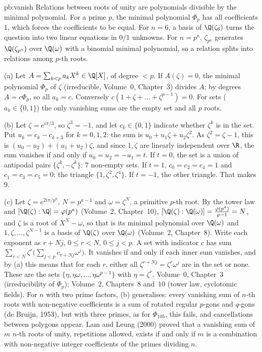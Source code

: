 \begin{solution}{pb:vanish}
\idea Relations between roots of unity are polynomials divisible by the minimal polynomial. For a prime $p$, the minimal
polynomial $\Phi_p$ has all coefficients $1$, which forces the coefficients to be equal. For $n=6$, a basis of
$\Q(\zeta_6)$ turns the question into two linear equations in $0$/$1$ unknowns. For $n=p^a$, $\zeta_{p^a}$ generates
$\Q(\zeta_{p^a})$ over $\Q(\omega)$ with a binomial minimal polynomial, so a relation splits into relations among $p$-th roots.

\writeup (a) Let $A=\sum_{k<p}a_kX^k\in\Q[X]$, of degree $<p$. If $A(\zeta)=0$, the minimal polynomial $\Phi_p$ of $\zeta$
(irreducible, Volume~0, Chapter~3) divides $A$; by degrees $A=c\Phi_p$, so all $a_k=c$. Conversely
$c(1+\zeta+\dots+\zeta^{p-1})=0$. For sets ($a_k\in\{0,1\}$) the only vanishing sums are the empty set and all $p$ roots.

(b) Let $\zeta=e^{i\pi/3}$, so $\zeta^3=-1$, and let $c_k\in\{0,1\}$ indicate whether $\zeta^k$ is in the set. Put
$u_k=c_k-c_{k+3}$ for $k=0,1,2$: the sum is $u_0+u_1\zeta+u_2\zeta^2$. As $\zeta^2=\zeta-1$, this is
$(u_0-u_2)+(u_1+u_2)\zeta$, and since $1,\zeta$ are linearly independent over $\R$, the sum vanishes if and only if
$u_0=u_2=-u_1=t$. If $t=0$, the set is a union of antipodal pairs $\{\zeta^k,-\zeta^k\}$: $7$ non-empty sets. If $t=1$,
$c_0=c_2=c_4=1$ and $c_1=c_3=c_5=0$: the triangle $\{1,\zeta^2,\zeta^4\}$. If $t=-1$, the other triangle. That makes $9$.

(c) Let $\zeta=e^{2i\pi/p^a}$, $N=p^{a-1}$ and $\omega=\zeta^N$, a primitive $p$-th root. By the tower law and
$[\Q(\zeta):\Q]=\varphi(p^a)$ (Volume~2, Chapter~10), $[\Q(\zeta):\Q(\omega)]=\frac{\varphi(p^a)}{p-1}=N$, and $\zeta$ is a root
of $X^N-\omega$, so that is its minimal polynomial over $\Q(\omega)$ and $1,\zeta,\dots,\zeta^{N-1}$ is a basis of $\Q(\zeta)$
over $\Q(\omega)$ (Volume~2, Chapter~8). Write each exponent as $r+Nj$, $0\le r<N$, $0\le j<p$. A set with indicator $c$ has
sum $\sum_{r<N}\zeta^r\bigl(\sum_{j<p}c_{r+Nj}\omega^j\bigr)$. It vanishes if and only if each inner sum vanishes, and by (a)
this means that for each $r$, either all $\zeta^{r+Nj}=\zeta^r\omega^j$ are in the set or none. These are the sets
$\{\eta,\eta\omega,\dots,\eta\omega^{p-1}\}$ with $\eta=\zeta^r$.
\tools Volume~0, Chapter~3 (irreducibility of $\Phi_p$); Volume~2, Chapters~8 and~10 (tower law, cyclotomic fields).
\leads For $n$ with two prime factors, (b) generalises: every vanishing sum of $n$-th roots with non-negative coefficients
is a sum of rotated regular $p$-gons and $q$-gons (de Bruijn, 1953), but with three primes, as for $\Phi_{105}$, this
fails, and cancellations between polygons appear. Lam and Leung (2000) proved that a vanishing sum of $m$ $n$-th roots of
unity, repetitions allowed, exists if and only if $m$ is a combination with non-negative integer coefficients of the
primes dividing $n$.
\end{solution}

